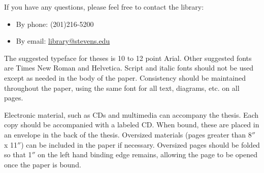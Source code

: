 If you have any questions, please feel free to contact the library:
\begin{itemize}
    \item By phone: (201)216-5200
    \item By email: \url{library@stevens.edu}
\end{itemize}


The suggested typeface for theses is 10 to 12 point Arial. Other suggested fonts are Times New Roman and Helvetica. Script and italic fonts should not be used except as needed in the body of the paper. Consistency should be maintained throughout the paper, using the same font for all text, diagrams, etc. on all pages.

Electronic material, such as CDs and multimedia can accompany the thesis. Each copy should be accompanied with a labeled CD. When bound, these are placed in an envelope in the back of the thesis.  Oversized materials (pages greater than 8$''$ x 11$''$) can be included in the paper if necessary. Oversized pages should be folded so that 1$''$ on the left hand binding edge remains, allowing the page to be opened once the paper is bound.
